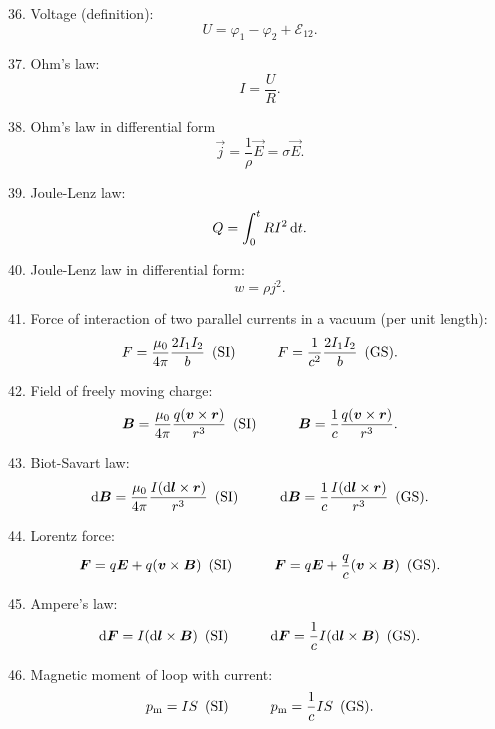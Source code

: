 36. Voltage (definition):
\begin{equation*}
	U = \varphi_1 - \varphi_2 + \mathcal{E}_{12}.
\end{equation*}

37. Ohm's law:
\begin{equation*}
	I = \frac{U}{R}.
\end{equation*}

38. Ohm's law in differential form
\begin{equation*}
	\vec{j} = \frac{1}{\rho} \vec{E} = \sigma\vec{E}.
\end{equation*}

39. Joule-Lenz law:
\begin{equation*}
	Q = \int_0^t RI^2\, \mathrm{d} t.
\end{equation*}

40. Joule-Lenz law in differential form:
\begin{equation*}
	w = \rho j^2.
\end{equation*}

41. Force of interaction of two parallel currents in a vacuum (per unit length):
\begin{equation*}
	F=\frac{\mu_0}{4\pi}\frac{2I_1I_2}{b} \,\,\,\text{(SI)}\quad\quad\quad F=\frac{1}{c^2}\frac{2I_1I_2}{b} \,\,\,\text{(GS)}.
\end{equation*}

42. Field of freely moving charge:
\begin{equation*}
	\boldsymbol{B} = \frac{\mu_0}{4\pi}\frac{q (\boldsymbol{v}\times\boldsymbol{r})}{r^3} \,\,\,\text{(SI)}\quad\quad\quad
	\boldsymbol{B} = \frac{1}{c}\frac{q (\boldsymbol{v}\times\boldsymbol{r})}{r^3}.
\end{equation*}

43. Biot-Savart law:
\begin{equation*}
	\mathrm{d}\boldsymbol{B}=\frac{\mu_0}{4\pi} \frac{I (\mathrm{d}\boldsymbol{l}\times\boldsymbol{r})}{r^3} \,\,\,\text{(SI)}\quad\quad\quad \mathrm{d}\boldsymbol{B}=\frac{1}{c} \frac{I (\mathrm{d}\boldsymbol{l}\times\boldsymbol{r})}{r^3} \,\,\,\text{(GS)}.
\end{equation*}

44. Lorentz force:
\begin{equation*}
	\boldsymbol{F}=q\boldsymbol{E} + q (\boldsymbol{v}\times\boldsymbol{B}) \,\,\,\text{(SI)}\quad\quad\quad \boldsymbol{F}=q\boldsymbol{E} + \frac{q}{c} (\boldsymbol{v}\times\boldsymbol{B}) \,\,\,\text{(GS)}.
\end{equation*}

45. Ampere's law:
\begin{equation*}
	\mathrm{d}\boldsymbol{F}=I (\mathrm{d}\boldsymbol{l}\times\boldsymbol{B}) \,\,\,\text{(SI)}\quad\quad\quad \mathrm{d}\boldsymbol{F}=\frac{1}{c} I (\mathrm{d}\boldsymbol{l}\times\boldsymbol{B}) \,\,\,\text{(GS)}.
\end{equation*}

46. Magnetic moment of loop with current:
\begin{equation*}
	p_{\text{m}}=IS \,\,\,\text{(SI)}\quad\quad\quad p_{\text{m}}=\frac{1}{c}IS \,\,\,\text{(GS)}.
\end{equation*}


